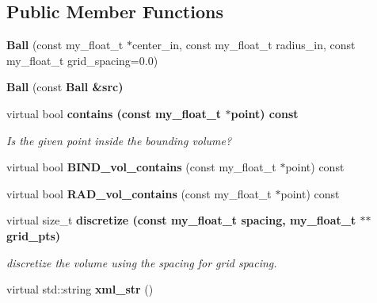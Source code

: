 \subsection*{Public Member Functions}
\begin{CompactItemize}
\item 
\textbf{Ball} (const my\_\-float\_\-t $\ast$center\_\-in, const my\_\-float\_\-t radius\_\-in, const my\_\-float\_\-t grid\_\-spacing=0.0)\label{classSimSite3D_1_1Ball_97e67bc08a56c79e9e959a632009ade6}

\item 
\textbf{Ball} (const \bf{Ball} \&src)\label{classSimSite3D_1_1Ball_75d5e1bf95a7262c6bc624dd12dfcc64}

\item 
virtual bool \bf{contains} (const my\_\-float\_\-t $\ast$point) const \label{classSimSite3D_1_1Ball_2f35f02b622dd5ab6a0587fea4decab9}

\begin{CompactList}\small\item\em Is the given point inside the bounding volume? \item\end{CompactList}\item 
virtual bool \textbf{BIND\_\-vol\_\-contains} (const my\_\-float\_\-t $\ast$point) const \label{classSimSite3D_1_1Ball_813573b67261525d0e929c403ada4edd}

\item 
virtual bool \textbf{RAD\_\-vol\_\-contains} (const my\_\-float\_\-t $\ast$point) const \label{classSimSite3D_1_1Ball_35f5cc5ed18329e95f9b76ec9e57341d}

\item 
virtual size\_\-t \bf{discretize} (const my\_\-float\_\-t spacing, my\_\-float\_\-t $\ast$$\ast$grid\_\-pts)\label{classSimSite3D_1_1Ball_a9f72b0b6f081f0d84907ae3dce7381b}

\begin{CompactList}\small\item\em discretize the volume using the spacing for grid spacing. \item\end{CompactList}\item 
virtual std::string \textbf{xml\_\-str} ()\label{classSimSite3D_1_1Ball_25e523c23461317176d63b322d700deb}

\end{CompactItemize}
